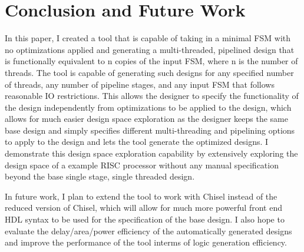 \section{Conclusion and Future Work}
In this paper, I created a tool that is capable of taking in a minimal FSM with no optimizations applied and generating a multi-threaded, pipelined design that is functionally equivalent to n copies of the input FSM, where n is the number of threads. The tool is capable of generating such designs for any specified number of threads, any number of pipeline stages, and any input FSM that follows reasonable IO restrictions. This allows the designer to specify the functionality of the design independently from optimizations to be applied to the design, which allows for much easier design space exploration as the designer keeps the same base design and simply specifies different multi-threading and pipelining options to apply to the design and lets the tool generate the optimized designs. I demonstrate this design space exploration capability by extensively exploring the design space of a example RISC processor without any manual specification beyond the base single stage, single threaded design.

In future work, I plan to extend the tool to work with Chisel instead of the reduced version of Chisel, which will allow for much more powerful front end HDL syntax to be used for the specification of the base design. I also hope to evaluate the delay/area/power efficiency of the automatically generated designs and improve the performance of the tool interms of logic generation efficiency.

